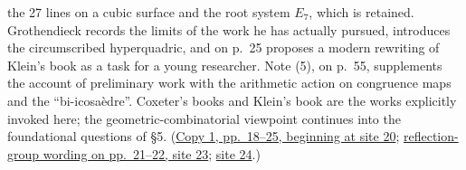 \documentclass[11pt,a4paper]{article}
\begin{document}
the 27 lines on a cubic surface and the root system $E_7$, which is
retained. Grothendieck records the limits of the work he has actually
pursued, introduces the circumscribed hyperquadric, and on p.~25 proposes
a modern rewriting of Klein's book as a task for a young researcher.
Note (5), on p.~55, supplements the account of preliminary work with
the arithmetic action on congruence maps and the ``bi-icosaèdre''.
Coxeter's books and Klein's book are the works explicitly invoked here;
the geometric-combinatorial viewpoint continues into the foundational
questions of \S5.
(\href{https://grothendieck.umontpellier.fr/web/viewer.html?file=../119.pdf\#page=21}{Copy 1, pp.~18--25, beginning at site 20};
\href{https://grothendieck.umontpellier.fr/web/viewer.html?file=../119.pdf\#page=24}{reflection-group wording on pp.~21--22, site 23};
\href{https://grothendieck.umontpellier.fr/web/viewer.html?file=../119.pdf\#page=25}{site 24}.)
\end{document}
